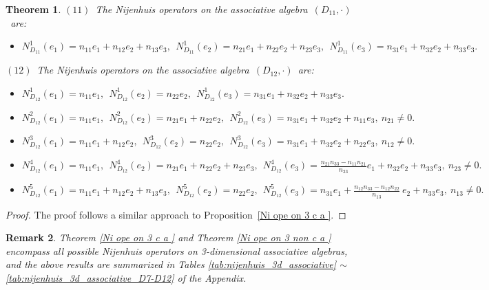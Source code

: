 \documentclass[12pt, reqno]{amsart}
\theoremstyle{plain}
\newtheorem{theorem}{Theorem}[section]
\newtheorem{remark}[theorem]{Remark}
\begin{document}
\begin{theorem}
$(11)$~The Nijenhuis operators on the associative algebra~$(D_{11},\cdot)$~are:
\begin{itemize}
   \item[]  $N_{D_{11}}^1(e_1)=n_{11}e_1 +n_{12}e_2+n_{13}e_3,
   ~~ N_{D_{11}}^1(e_2)= n_{21}e_1 +n_{22}e_2+n_{23}e_3,~~
   N_{D_{11}}^1(e_3)=  n_{31}e_1 +n_{32}e_2+n_{33}e_3.$
   \end{itemize}

$(12)$~The Nijenhuis operators on the associative algebra~$(D_{12},\cdot)$~are:
\begin{itemize}
   \item[]  $N_{D_{12}}^1(e_1)=n_{11}e_1,
   ~~ N_{D_{12}}^1(e_2)= n_{22}e_2,~~
   N_{D_{12}}^1(e_3)=  n_{31}e_1 +n_{32}e_2+n_{33}e_3.$
     \item[]  $N_{D_{12}}^2(e_1)=n_{11}e_1,
   ~~ N_{D_{12}}^2(e_2)= n_{21}e_1 +n_{22}e_2,~~
   N_{D_{12}}^2(e_3)=  n_{31}e_1 +n_{32}e_2+n_{11}e_3,~n_{21}\neq 0.$
     \item[]  $N_{D_{12}}^3(e_1)=n_{11}e_1+n_{12}e_2,
   ~~ N_{D_{12}}^3(e_2)= n_{22}e_2,~~
   N_{D_{12}}^3(e_3)=  n_{31}e_1 +n_{32}e_2+n_{22}e_3,~n_{12}\neq 0.$
    \item[]  $N_{D_{12}}^4(e_1)=n_{11}e_1,
   ~~ N_{D_{12}}^4(e_2)= n_{21}e_1 +n_{22}e_2+n_{23}e_3,~~
   N_{D_{12}}^4(e_3)=  \frac{n_{21}n_{33}-n_{11}n_{21}}{n_{23}}e_1 +n_{32}e_2+n_{33}e_3,~n_{23}\neq 0.$
    \item[]  $N_{D_{12}}^5(e_1)=n_{11}e_1 +n_{12}e_2+n_{13}e_3,
   ~~ N_{D_{12}}^5(e_2)=n_{22}e_2,~~
   N_{D_{12}}^5(e_3)=n_{31}e_1 + \frac{n_{12}n_{33}-n_{12}n_{22}}{n_{13}}~e_2+n_{33}e_3,~n_{13}\neq 0.$
   \end{itemize}
\end{theorem}
\begin{proof}
The proof follows a similar approach to Proposition~\ref{Ni ope on 3 c a }.
\end{proof}
\begin{remark}
Theorem \ref{Ni ope on 3 c a } and Theorem \ref{Ni ope on 3 non c a } encompass all possible Nijenhuis operators on 3-dimensional associative algebras, and the above results are summarized in Tables \ref{tab:nijenhuis_3d_associative} $\sim$ \ref{tab:nijenhuis_3d_associative_D7-D12} of the Appendix. 
\end{remark}
\end{document}
